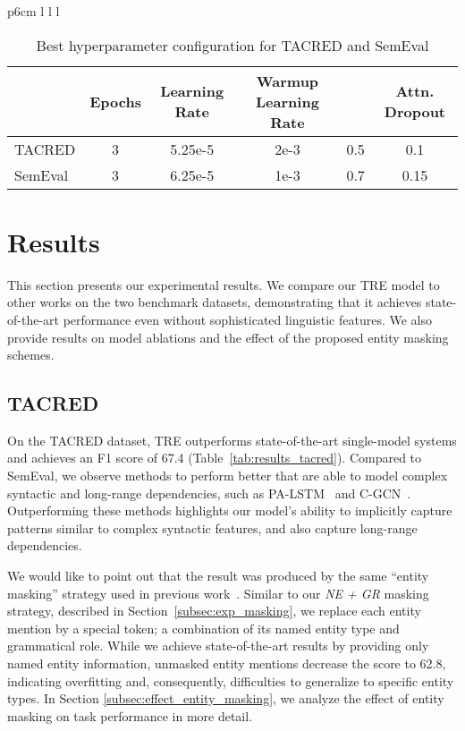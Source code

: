\documentclass[akbc,twoside,11pt]{article}
\begin{document}
\begin{table}[ht!]
\begin{tabular}{p{6cm} l l l}
\begin{table}[ht!]
    \centering
    \begin{tabular}{l c c c c c} \\\hline
        & Epochs & Learning Rate & Warmup Learning Rate &  & Attn. Dropout  \\\hline
        TACRED & 3 & 5.25e-5 & 2e-3 & 0.5 & 0.1 \\
        SemEval & 3 & 6.25e-5 & 1e-3 & 0.7 & 0.15 \\
        \hline
    \end{tabular}
    \caption{Best hyperparameter configuration for TACRED and SemEval}
    \label{tab:best_hyperparameters}
\end{table}

\section{Results}
\label{sec:results}
This section presents our experimental results. We compare our TRE model to other works on the two benchmark datasets, demonstrating that it achieves state-of-the-art performance even without sophisticated linguistic features. We also provide results on model ablations and the effect of the proposed entity masking schemes.


\subsection{TACRED}
On the TACRED dataset, TRE outperforms state-of-the-art single-model systems and achieves an F1 score of 67.4 (Table~\ref{tab:results_tacred}). Compared to SemEval, we observe methods to perform better that are able to model complex syntactic and long-range dependencies, such as PA-LSTM~\cite{zhang_position_aware_2017} and C-GCN~\cite{zhang_graphco_2018}. Outperforming these methods highlights our model's ability to implicitly capture patterns similar to complex syntactic features, and also capture long-range dependencies.

We would like to point out that the result was produced by the same ``entity masking'' strategy used in previous work~\cite{zhang_position_aware_2017, zhang_graphco_2018}. Similar to our \textit{NE + GR} masking strategy, described in Section~\ref{subsec:exp_masking}, we replace each entity mention by a special token; a combination of its named entity type and grammatical role. While we achieve state-of-the-art results by providing only named entity information, unmasked entity mentions decrease the score to 62.8, indicating overfitting and, consequently, difficulties to generalize to specific entity types. In Section \ref{subsec:effect_entity_masking}, we analyze the effect of entity masking on task performance in more detail.


\end{tabular}
\end{table}
\end{document}
